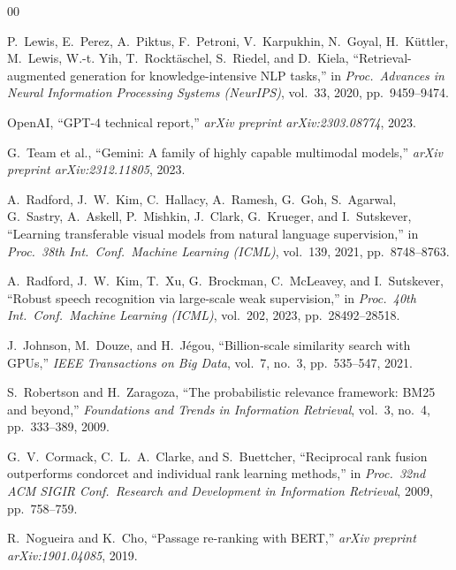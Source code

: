 \documentclass[conference]{IEEEtran}
\begin{document}
\balance
\begin{thebibliography}{00}

P.~Lewis, E.~Perez, A.~Piktus, F.~Petroni, V.~Karpukhin, N.~Goyal,
H.~K\"{u}ttler, M.~Lewis, W.-t. Yih, T.~Rockt\"{a}schel, S.~Riedel, and
D.~Kiela,
``Retrieval-augmented generation for knowledge-intensive NLP tasks,''
in \textit{Proc.\ Advances in Neural Information Processing Systems (NeurIPS)},
vol.~33, 2020, pp.~9459--9474.

OpenAI,
``GPT-4 technical report,''
\textit{arXiv preprint arXiv:2303.08774}, 2023.

G.~Team et al.,
``Gemini: A family of highly capable multimodal models,''
\textit{arXiv preprint arXiv:2312.11805}, 2023.

A.~Radford, J.~W.~Kim, C.~Hallacy, A.~Ramesh, G.~Goh, S.~Agarwal,
G.~Sastry, A.~Askell, P.~Mishkin, J.~Clark, G.~Krueger, and I.~Sutskever,
``Learning transferable visual models from natural language supervision,''
in \textit{Proc.\ 38th Int.\ Conf.\ Machine Learning (ICML)},
vol.~139, 2021, pp.~8748--8763.

A.~Radford, J.~W.~Kim, T.~Xu, G.~Brockman, C.~McLeavey, and I.~Sutskever,
``Robust speech recognition via large-scale weak supervision,''
in \textit{Proc.\ 40th Int.\ Conf.\ Machine Learning (ICML)},
vol.~202, 2023, pp.~28492--28518.

J.~Johnson, M.~Douze, and H.~J\'{e}gou,
``Billion-scale similarity search with GPUs,''
\textit{IEEE Transactions on Big Data}, vol.~7, no.~3, pp.~535--547, 2021.

S.~Robertson and H.~Zaragoza,
``The probabilistic relevance framework: BM25 and beyond,''
\textit{Foundations and Trends in Information Retrieval},
vol.~3, no.~4, pp.~333--389, 2009.

G.~V.~Cormack, C.~L.~A.~Clarke, and S.~Buettcher,
``Reciprocal rank fusion outperforms condorcet and individual rank learning methods,''
in \textit{Proc.\ 32nd ACM SIGIR Conf.\ Research and Development in
Information Retrieval}, 2009, pp.~758--759.

R.~Nogueira and K.~Cho,
``Passage re-ranking with BERT,''
\textit{arXiv preprint arXiv:1901.04085}, 2019.


\end{thebibliography}
\end{document}
